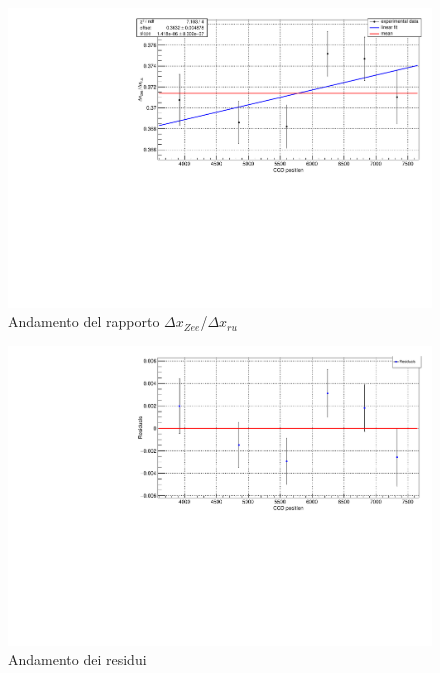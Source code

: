 \documentclass{article}
\begin{document}
	\begin{center}
		\begin{figure}[H]
			\centering
			\includegraphics[scale=0.38, angle=0]{campomax/fit.pdf}
			\setlength{\belowcaptionskip}{-20pt}
			\caption{Andamento del rapporto $\Delta x_{Zee}$/$\Delta x_{ru}$}
			\label{fig:fit_rapporto}
		\end{figure}
	\end{center}

	\begin{center}
		\begin{figure}[H]
			\centering
			\includegraphics[scale=0.38, angle=0]{campomax/residuals.pdf}
			\setlength{\belowcaptionskip}{-20pt}
			\caption{Andamento dei residui}
			\label{fig:fit_rapporto_res}
		\end{figure}
	\end{center}
\end{document}
